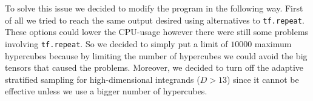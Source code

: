 \documentclass[../main/main.tex]{subfiles}
\begin{document}
To solve this issue we decided to modify the program in the following way.
First of all we tried to reach the same output desired using alternatives to \texttt{tf.repeat}. These options could lower the CPU-usage however there were still some problems involving \texttt{tf.repeat}. So we decided to simply put a limit of $10000$ maximum hypercubes because by limiting the number of hypercubes we could avoid the big tensors that caused the problems.
Moreover,  we decided to turn off the adaptive stratified sampling for high-dimensional integrands ($D > 13$) since it cannot be effective unless we use a bigger number of hypercubes.
\end{document}
